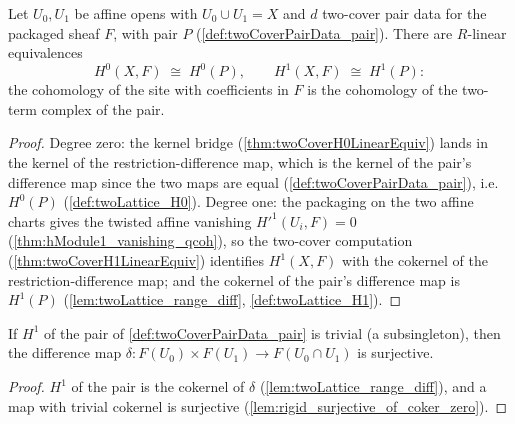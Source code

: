\begin{definition}
  \label{def:twoCoverPair_h0h1}
  \leanok
  Let \(U_0, U_1\) be affine opens with \(U_0 \cup U_1 = X\) and \(d\) two-cover pair
  data for the packaged sheaf \(F\), with pair \(P\)
  (\ref{def:twoCoverPairData_pair}). There are \(R\)-linear equivalences
  \[
    H^0(X, F) \;\cong\; H^0(P), \qquad H^1(X, F) \;\cong\; H^1(P) :
  \]
  the cohomology of the site with coefficients in \(F\) is the cohomology of the
  two-term complex of the pair.
\end{definition}
\begin{proof}
  \leanok
  Degree zero: the kernel bridge (\ref{thm:twoCoverH0LinearEquiv}) lands in the kernel
  of the restriction-difference map, which is the kernel of the pair's difference map
  since the two maps are equal (\ref{def:twoCoverPairData_pair}), i.e.\ \(H^0(P)\)
  (\ref{def:twoLattice_H0}). Degree one: the packaging on the two affine charts gives
  the twisted affine vanishing \(H'^1(U_i, F) = 0\)
  (\ref{thm:hModule1_vanishing_qcoh}), so the two-cover computation
  (\ref{thm:twoCoverH1LinearEquiv}) identifies \(H^1(X, F)\) with the cokernel of the
  restriction-difference map; and the cokernel of the pair's difference map is
  \(H^1(P)\) (\ref{lem:twoLattice_range_diff}, \ref{def:twoLattice_H1}).
\end{proof}

\begin{lemma}
  \label{lem:twoCoverPair_surjective_diff}
  \leanok
  If \(H^1\) of the pair of \ref{def:twoCoverPairData_pair} is trivial (a
  subsingleton), then the difference map \(\delta : F(U_0) \times F(U_1) \to
  F(U_0 \cap U_1)\) is surjective.
\end{lemma}
\begin{proof}
  \leanok
  \(H^1\) of the pair is the cokernel of \(\delta\) (\ref{lem:twoLattice_range_diff}),
  and a map with trivial cokernel is surjective
  (\ref{lem:rigid_surjective_of_coker_zero}).
\end{proof}

